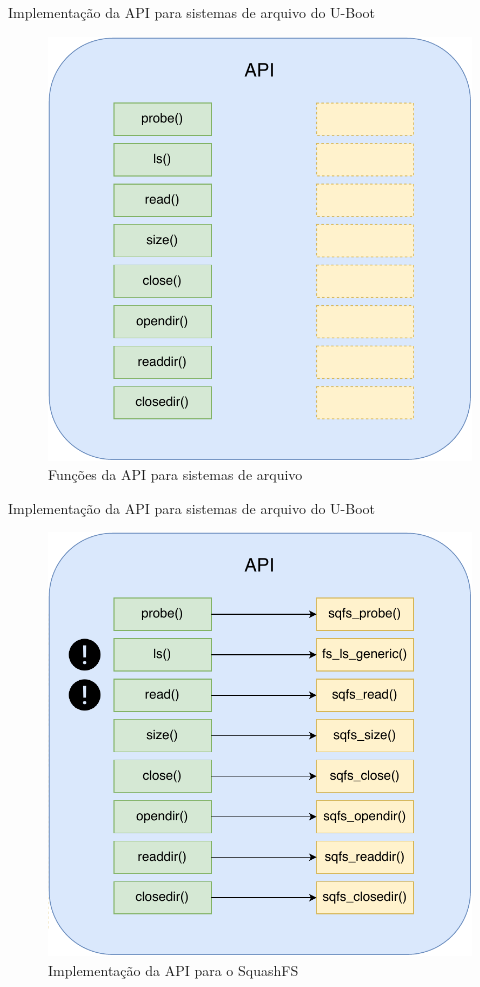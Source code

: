 \begin{frame}{Implementação da API para sistemas de arquivo do U-Boot}
\begin{figure}
    \centering
    \includegraphics[scale=0.45]{figuras/API.pdf}
    \caption{Funções da API para sistemas de arquivo}
    \label{fig:my_label}
\end{figure}
\end{frame}

\begin{frame}{Implementação da API para sistemas de arquivo do U-Boot}
\begin{figure}
    \centering
    \includegraphics[scale=0.45]{figuras/API2.pdf}
    \caption{Implementação da API para o SquashFS}
    \label{fig:my_label}
\end{figure}
\end{frame}


